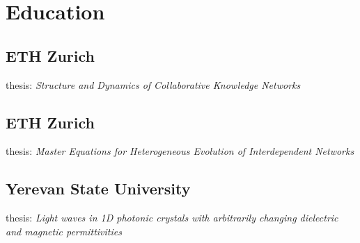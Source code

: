 \documentclass[]{vn-resume}
\begin{document}
%
%
\begin{minipage}[t]{0.3\textwidth} 
    
    
    \section{Education} 
    
    \subsection{ETH Zurich}
    thesis: \emph{Structure and Dynamics of Collaborative Knowledge Networks}
    \sectionsep
    
    \subsection{ETH Zurich}
    thesis: \emph{Master Equations for Heterogeneous Evolution of Interdependent Networks}\\
    \sectionsep
    
    \subsection{Yerevan State University}
    thesis: \emph{Light waves in 1D photonic crystals with arbitrarily changing dielectric and magnetic permittivities}\\
    \sectionsep
    
    
    

\end{minipage}
\end{document}
